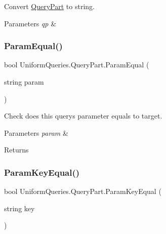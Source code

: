 Convert \mbox{\hyperlink{struct_uniform_queries_1_1_query_part}{Query\+Part}} to string. 


\begin{DoxyParams}{Parameters}
{\em qp} & \\
\hline
\end{DoxyParams}
\mbox{\label{struct_uniform_queries_1_1_query_part_abda3bf2ddc04c911364a09655e8fc4f2}} 
\subsubsection{\texorpdfstring{Param\+Equal()}{ParamEqual()}}
{\footnotesize\ttfamily bool Uniform\+Queries.\+Query\+Part.\+Param\+Equal (\begin{DoxyParamCaption}\item[{string}]{param }\end{DoxyParamCaption})}



Check does this query\textquotesingle{}s parameter equals to target. 


\begin{DoxyParams}{Parameters}
{\em param} & \\
\hline
\end{DoxyParams}
\begin{DoxyReturn}{Returns}

\end{DoxyReturn}
\mbox{\label{struct_uniform_queries_1_1_query_part_a5252d13a0a8c211c47cba54f3749aad1}} 
\subsubsection{\texorpdfstring{Param\+Key\+Equal()}{ParamKeyEqual()}}
{\footnotesize\ttfamily bool Uniform\+Queries.\+Query\+Part.\+Param\+Key\+Equal (\begin{DoxyParamCaption}\item[{string}]{key }\end{DoxyParamCaption})}



